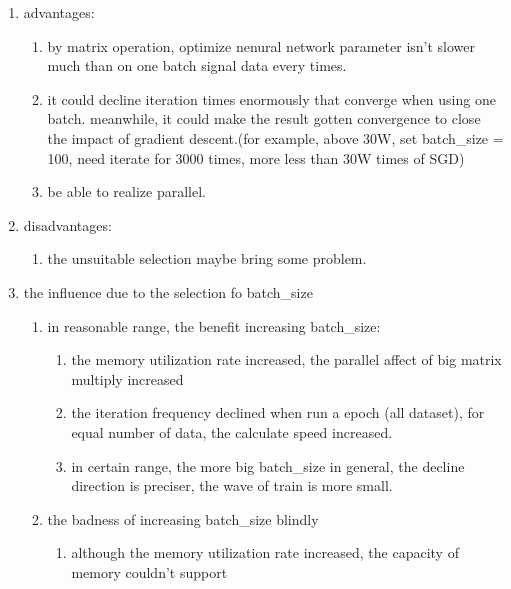\documentclass[12pt]{ctexart}%
\begin{document}
\begin{itemize}
\begin{enumerate}[(1)]
\begin{enumerate}
						\item advantages:
							\begin{enumerate}
								\item by matrix operation, optimize nenural network parameter isn't slower much than on one batch  signal data every times.
								\item it could decline iteration times enormously that converge when using one batch. meanwhile, it could make the result gotten convergence to close the impact of gradient descent.(for example, above 30W, set batch\_size = 100, need iterate for 3000 times, more less than 30W times of SGD)
								\item be able to realize parallel.
							\end{enumerate}
						
						\item disadvantages:
							\begin{enumerate}
								\item the unsuitable selection maybe bring some problem.
							\end{enumerate}
						
						\item the influence due to the selection fo batch\_size
							\begin{enumerate}[i]
								\item in reasonable range, the benefit increasing batch\_size:
									\begin{enumerate}[1)]
										\item the memory utilization rate increased, the parallel affect of big matrix multiply increased
										
										\item the iteration frequency declined when run a epoch (all dataset), for equal number of data, the calculate speed increased.
										
										\item in certain range, the more big batch\_size in general, the decline direction is preciser, the wave of train is more small.
									\end{enumerate}
								
								\item the badness of increasing batch\_size blindly
									\begin{enumerate}[1)]
										\item although the memory utilization rate increased, the capacity of memory couldn't support
										

\end{enumerate}
\end{enumerate}
\end{enumerate}
\end{enumerate}
\end{itemize}
\end{document}
